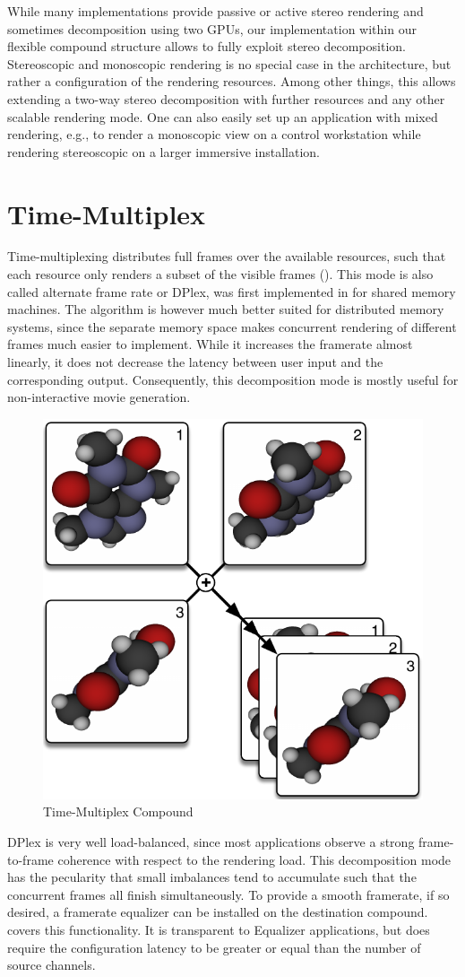 While many implementations provide passive or active stereo rendering and
sometimes decomposition using two GPUs, our implementation within our flexible
compound structure allows to fully exploit stereo decomposition.  Stereoscopic
and monoscopic rendering is no special case in the architecture, but rather a
configuration of the rendering resources. Among other things, this allows
extending a two-way stereo decomposition with further resources and any other
scalable rendering mode. One can also easily set up an application with mixed
rendering, e.g., to render a monoscopic view on a control workstation while
rendering stereoscopic on a larger immersive installation.


\section{Time-Multiplex}

Time-multiplexing distributes full frames over the available resources, such
that each resource only renders a subset of the visible frames ().
This mode is also called alternate frame rate or DPlex, was first implemented in
\cite{BRE:05} for shared memory machines. The algorithm is however much better
suited for distributed memory systems, since the separate memory space makes
concurrent rendering of different frames much easier to implement. While it
increases the framerate almost linearly, it does not decrease the latency
between user input and the corresponding output. Consequently, this
decomposition mode is mostly useful for non-interactive movie generation.

\begin{figure}
\includegraphics[width=.382\textwidth]{images/DPlex}
{\caption{\label{fDPlex}Time-Multiplex Compound}} \end{figure}

DPlex is very well load-balanced, since most applications observe a strong
frame-to-frame coherence with respect to the rendering load. This decomposition
mode has the pecularity that small imbalances tend to accumulate such that the
concurrent frames all finish simultaneously. To provide a smooth framerate, if
so desired, a framerate equalizer can be installed on the destination compound.
 covers this functionality. It is transparent to
\textsf{Equalizer} applications, but does require the configuration latency to
be greater or equal than the number of source channels.


